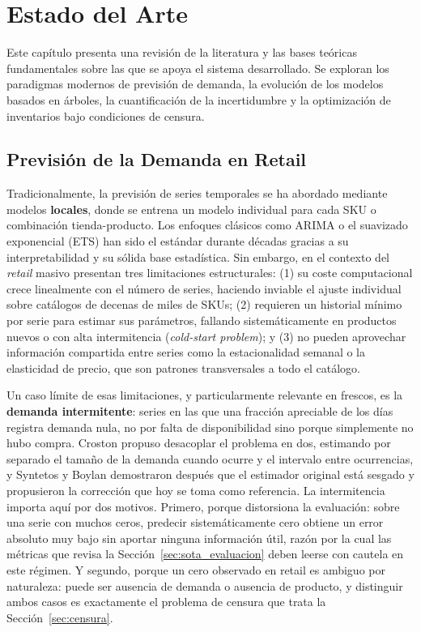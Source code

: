 \chapter{Estado del Arte}
\label{chap:estado_del_arte}

Este capítulo presenta una revisión de la literatura y las bases teóricas fundamentales sobre las que se apoya el sistema desarrollado. Se exploran los paradigmas modernos de previsión de demanda, la evolución de los modelos basados en árboles, la cuantificación de la incertidumbre y la optimización de inventarios bajo condiciones de censura.

\section{Previsión de la Demanda en Retail}
Tradicionalmente, la previsión de series temporales se ha abordado mediante modelos \textbf{locales}, donde se entrena un modelo individual para cada SKU o combinación tienda-producto. Los enfoques clásicos como ARIMA \cite{hyndman2021forecasting} o el suavizado exponencial (ETS) han sido el estándar durante décadas gracias a su interpretabilidad y su sólida base estadística. Sin embargo, en el contexto del \textit{retail} masivo presentan tres limitaciones estructurales: (1) su coste computacional crece linealmente con el número de series, haciendo inviable el ajuste individual sobre catálogos de decenas de miles de SKUs; (2) requieren un historial mínimo por serie para estimar sus parámetros, fallando sistemáticamente en productos nuevos o con alta intermitencia (\textit{cold-start problem}); y (3) no pueden aprovechar información compartida entre series como la estacionalidad semanal o la elasticidad de precio, que son patrones transversales a todo el catálogo.

Un caso límite de esas limitaciones, y particularmente relevante en frescos, es la
\textbf{demanda intermitente}: series en las que una fracción apreciable de los días registra
demanda nula, no por falta de disponibilidad sino porque simplemente no hubo compra. Croston
\cite{croston1972forecasting} propuso desacoplar el problema en dos, estimando por separado el
tamaño de la demanda cuando ocurre y el intervalo entre ocurrencias, y Syntetos y Boylan
\cite{syntetos2005accuracy} demostraron después que el estimador original está sesgado y
propusieron la corrección que hoy se toma como referencia. La intermitencia importa aquí por dos
motivos. Primero, porque distorsiona la evaluación: sobre una serie con muchos ceros, predecir
sistemáticamente cero obtiene un error absoluto muy bajo sin aportar ninguna información útil,
razón por la cual las métricas que revisa la Sección~\ref{sec:sota_evaluacion} deben leerse con
cautela en este régimen. Y segundo, porque un cero observado en retail es ambiguo por naturaleza:
puede ser ausencia de demanda o ausencia de producto, y distinguir ambos casos es exactamente el
problema de censura que trata la Sección~\ref{sec:censura}.

